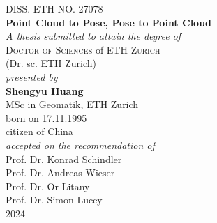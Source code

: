 
\begin{center}
	\large{DISS. ETH NO. 27078}\\
\vspace{2 cm}
	\Large{\textbf{Point Cloud to Pose, Pose to Point Cloud}}\\
\vspace{2 cm}
	\large{\emph{A thesis submitted to attain the degree of}}\\
\vspace{0.5cm}
	\large{\textsc{Doctor of Sciences} of \textsc{ETH Zurich}}\\
\vspace{0.5cm}
	\large{(Dr. sc. ETH Zurich)}\\
\vspace{2cm}
	\large{\emph{presented by}}\\
\vspace{0.5cm}
	\large{\textbf{Shengyu Huang}}\\
\vspace{0.3cm}
	\large{MSc in Geomatik, ETH Zurich}\\
\vspace{0.3cm}
	\large{born on 17.11.1995}\\
\vspace{0.3cm}
	\large{citizen of China}\\
\vspace{2cm}
	\large{\emph{accepted on the recommendation of}}\\
\vspace{0.5cm}
	\large{Prof. Dr. Konrad Schindler%
}\\
\vspace{0.1cm}
	\large{Prof. Dr. Andreas Wieser%
}\\
\vspace{0.1cm}
	\large{Prof. Dr. Or Litany%
}\\
\vspace{0.1cm}
	\large{Prof. Dr. Simon Lucey%
}\\
\vspace{2cm}
	\large{2024}
\end{center}


